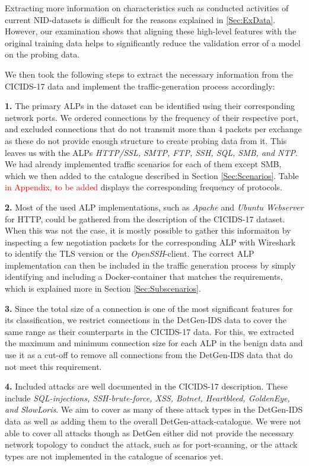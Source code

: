 \documentclass[runningheads]{llncs}
\begin{document}
Extracting more information on characteristics such as conducted activities of current NID-datasets is difficult for the reasons explained in \ref{Sec:ExData}. However, our examination shows that aligning these high-level features with the original training data helps to significantly reduce the validation error of a model on the probing data.

We then took the following steps to extract the necessary information from the CICIDS-17 data and implement the traffic-generation process accordingly:

\textbf{1.} The primary ALPs in the dataset can be identified using their corresponding network ports. We ordered connections by the frequency of their respective port, and excluded connections that do not transmit more than 4 packets per exchange as these do not provide enough structure to create probing data from it. This leaves us with the ALPs \textit{HTTP/SSL, SMTP, FTP, SSH, SQL, SMB, and NTP}. We had already implemented traffic scenarios for each of them except SMB, which we then added to the catalogue described in Section \ref{Sec:Scenarios}. Table \textcolor{red}{in Appendix, to be added} displays the corresponding frequency of protocols.

\textbf{2.} Most of the used ALP implementations, such as \textit{Apache} and \textit{Ubuntu Webserver} for HTTP, could be gathered from the description of the CICIDS-17 dataset. When this was not the case, it is mostly possible to gather this informaiton by inspecting a few negotiation packets for the corresponding ALP with Wireshark to identify the TLS version or the \textit{OpenSSH}-client. The correct ALP implementation can then be included in the traffic generation process by simply identifying and including a Docker-container that matches the requirements, which is explained more in Section \ref{Sec:Subscenarios}.

\textbf{3.} Since the total size of a connection is one of the most significant features for its classification, we restrict connections in the DetGen-IDS data to cover the same range as their counterparts in the CICIDS-17 data. For this, we extracted the maximum and minimum connection size for each ALP in the benign data and use it as a cut-off to remove all connections from the DetGen-IDS data that do not meet this requirement.

\textbf{4.} Included attacks are well documented in the CICIDS-17 description. These include \textit{SQL-injections, SSH-brute-force, XSS, Botnet, Heartbleed, GoldenEye, and SlowLoris}. We aim to cover as many of these attack types in the DetGen-IDS data as well as adding them to the overall DetGen-attack-catalogue. We were not able to cover all attacks though as DetGen either did not provide the necessary network topology to conduct the attack, such as for port-scanning, or the attack types are not implemented in the catalogue of scenarios yet. 
\end{document}
